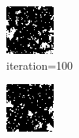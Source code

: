 \documentclass{article}
\begin{document}
\begin{figure}[h]
\begin{subfigure}[t]{0.18\textwidth}
\includegraphics[width=\textwidth]{./computational/results/gibbs_node_sampler_negative_iter_100.png}
\vspace{-0.6cm}
\caption{iteration=100}
\end{subfigure}\hspace{0.01\textwidth}
\begin{subfigure}[t]{0.18\textwidth}
\centering
\includegraphics[width=\textwidth]{./computational/results/gibbs_node_sampler_negative_iter_200.png}

\end{subfigure}
\end{figure}
\end{document}
